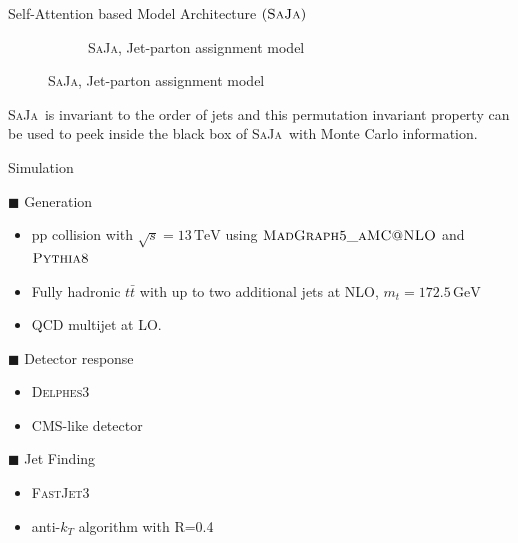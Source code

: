 \documentclass[10pt]{beamer}
\newcommand{\textGeV}[0]{\text{GeV}}
\newcommand{\saja}[0]{\textsc{SaJa}}
\begin{document}
\begin{frame}[fragile]{Self-Attention based Model Architecture $(\textsc{SaJa})$}
\begin{figure}
\begin{subfigure}[t]{0.3\textwidth}
            \caption{\saja, Jet-parton assignment model}
        \end{subfigure}
      \hfill
    \end{figure}
    {\footnotesize \saja\, is invariant to the order of jets and this permutation invariant property can be used to peek inside the black box of \saja\, with Monte Carlo information.}
\end{frame}


\begin{frame}[fragile]{Simulation}
    \begin{block}{$\blacksquare$ Generation}
        \smallskip
        \begin{itemize}
            \item pp collision with $\sqrt{s}=13\,\text{TeV}$ using $\textsc{MadGraph5\_aMC@NLO}$ and $\textsc{Pythia8}$
            \item Fully hadronic $ t\bar{t} $ with up to two additional jets at NLO, $m_{t}=172.5\,\textGeV$
            \item QCD multijet at LO.
        \end{itemize}
    \end{block}
    \medskip
    \begin{block}{$\blacksquare$ Detector response}
        \smallskip
        \begin{itemize}
            \item \textsc{Delphes3}
            \item CMS-like detector
        \end{itemize}
    \end{block}
    \begin{block}{$\blacksquare$ Jet Finding}
        \smallskip
        \begin{itemize}
            \item \textsc{FastJet3}
            \item anti-$k_{T}$ algorithm with R=0.4
        \end{itemize}
    \end{block}
\end{frame}
\end{document}
